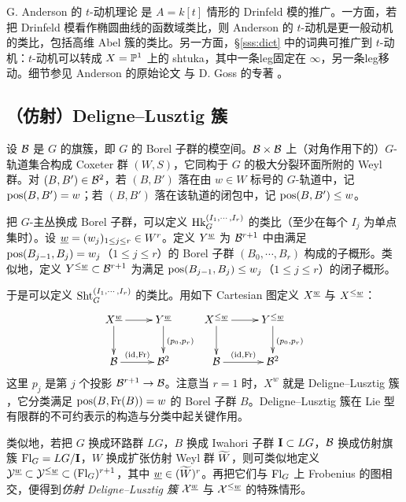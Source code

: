 G. Anderson 的 $t$-动机理论 \cite{And} 是 $A=k[t]$ 情形的 Drinfeld 模的推广。一方面，若把 Drinfeld 模看作椭圆曲线的函数域类比，则 Anderson 的 $t$-动机是更一般动机的类比，包括高维 Abel 簇的类比。另一方面，\S\ref{sss:dict} 中的词典可推广到 $t$-动机：$t$-动机可以转成 $X=\mathbb{P}^{1}$ 上的 shtuka，其中一条leg固定在 $\infty$，另一条leg移动。细节参见 Anderson 的原始论文 \cite{And} 与 D. Goss 的专著 \cite{Goss}。

\subsection{（仿射）Deligne–Lusztig 簇}
设 $\mathcal{B}$ 是 $G$ 的旗簇，即 $G$ 的 Borel 子群的模空间。$\mathcal{B}\times\mathcal{B}$ 上（对角作用下的）$G$-轨道集合构成 Coxeter 群 $(W,S)$，它同构于 $G$ 的极大分裂环面所附的 Weyl 群。对 $(B,B')\in \mathcal{B}^{2}$，若 $(B,B')$ 落在由 $w\in W$ 标号的 $G$-轨道中，记 $\mathrm{pos}(B,B')=w$；若 $(B,B')$ 落在该轨道的闭包中，记 $\mathrm{pos}(B,B')\le w$。

把 $G$-主丛换成 Borel 子群，可以定义 $\textup{Hk}^{(I_{1},\cdots, I_{r})}_{G}$ 的类比（至少在每个 $I_{j}$ 为单点集时）。设 $\underline w=(w_{j})_{1\le j\le r}\in W^{r}$。定义 $Y^{\underline w}$ 为 $\mathcal{B}^{r+1}$ 中由满足 $\mathrm{pos}(B_{j-1},B_{j})=w_{j}$（$1\le j\le r$）的 Borel 子群 $(B_{0},\cdots, B_{r})$ 构成的子概形。类似地，定义 $Y^{\le \underline w}\subset \mathcal{B}^{r+1}$ 为满足 $\mathrm{pos}(B_{j-1},B_{j})\le w_{j}$（$1\le j\le r$）的闭子概形。

于是可以定义 $\textup{Sht}^{(I_{1},\cdots, I_{r})}_{G}$ 的类比。用如下 Cartesian 图定义 $X^{\underline w}$ 与 $X^{\le \underline w}$：
\begin{equation*}
\xymatrix{ X^{\un w}\ar[r]\ar[d] & Y^{\un w}\ar[d]^{(p_{0}, p_{r})} & X^{\le\un w}\ar[r]\ar[d]  & Y^{\le\un w}\ar[d]^{(p_{0}, p_{r})} \\
\cB\ar[r]^-{(\id,\Fr)} & \cB^{2} & \cB\ar[r]^-{(\id,\Fr)} & \cB^{2}
}
\end{equation*}
这里 $p_{j}$ 是第 $j$ 个投影 $\mathcal{B}^{r+1}\to \mathcal{B}$。注意当 $r=1$ 时，$X^{w}$ 就是 Deligne–Lusztig 簇 \cite[Definition 1.4]{DL}，它分类满足 $\mathrm{pos}(B,\textup{Fr}(B))=w$ 的 Borel 子群 $B$。Deligne–Lusztig 簇在 Lie 型有限群的不可约表示的构造与分类中起关键作用。

类似地，若把 $G$ 换成环路群 $LG$，$B$ 换成 Iwahori 子群 $\mathbf{I}\subset LG$，$\mathcal{B}$ 换成仿射旗簇 $\textup{Fl}_{G}=LG/\mathbf{I}$，$W$ 换成扩张仿射 Weyl 群 $\widetilde{W}$，则可类似地定义 $\mathcal{Y}^{\underline w}\subset \mathcal{Y}^{\le\underline w}\subset (\textup{Fl}_{G})^{r+1}$，其中 $\underline w\in (\widetilde{W})^{r}$。再把它们与 $\textup{Fl}_{G}$ 上 Frobenius 的图相交，便得到\emph{仿射 Deligne–Lusztig 簇} $\mathcal{X}^{\underline w}$ 与 $\mathcal{X}^{\le \underline  w}$ 的特殊情形。

